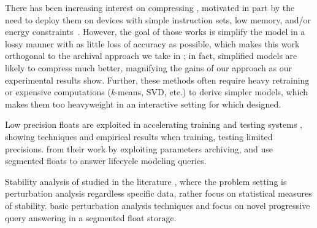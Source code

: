 \documentclass[conference]{IEEEtran}
\begin{document}
There has been increasing interest on compressing \dnn\models, motivated in
part by the need to deploy them on devices with simple instruction sets, low
memory, and/or energy constraints~\cite{han2015deep,denton2014exploiting,sung2015resiliency}. 
However, the goal of those works is simplify the model in a lossy manner with as
little loss of accuracy as possible, which makes this work orthogonal to
the archival approach we take in \modelhub; in fact, simplified models
are likely to compress much better, magnifying the gains of our approach as
our experimental results show.
Further, these methods often require heavy retraining or expensive computations
({\em k}-means, SVD, etc.) to derive simpler models, which makes them too
heavyweight in an interactive setting for which \DLV\is designed. %


Low precision floats are exploited in accelerating training and testing systems \cite{vanhoucke2011improving,sung2015resiliency,gupta2015deep}, showing techniques and empirical results when training, testing \dnn\with limited precisions. \modelhub\differs from their work by exploiting parameters archiving, and use segmented floats to answer lifecycle modeling queries.


Stability analysis of \dnn\is studied in the literature \cite{stevenson1990sensitivity,zeng2001sensitivity,yang2013computation}, where the problem setting is perturbation analysis regardless specific data, rather focus on statistical measures of stability. \modelhub\uses basic perturbation analysis techniques and focus on novel progressive query answering in a segmented float storage.
\end{document}
